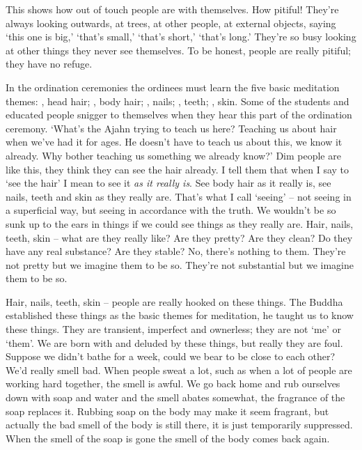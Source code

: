 This shows how out of touch people are with themselves. How pitiful! They're always looking outwards, at trees, at other people, at external objects, saying `this one is big,' `that's small,' `that's short,' `that's long.' They're so busy looking at other things they never see themselves. To be honest, people are really pitiful; they have no refuge.

In the ordination ceremonies the ordinees must learn the five basic meditation themes: , head hair; , body hair; , nails; , teeth; , skin. Some of the students and educated people snigger to themselves when they hear this part of the ordination ceremony. `What's the Ajahn trying to teach us here? Teaching us about hair when we've had it for ages. He doesn't have to teach us about this, we know it already. Why bother teaching us something we already know?' Dim people are like this, they think they can see the hair already. I tell them that when I say to `see the hair' I mean to see it \textit{as it really is}. See body hair as it really is, see nails, teeth and skin as they really are. That's what I call `seeing' -- not seeing in a superficial way, but seeing in accordance with the truth. We wouldn't be so sunk up to the ears in things if we could see things as they really are. Hair, nails, teeth, skin -- what are they really like? Are they pretty? Are they clean? Do they have any real substance? Are they stable? No, there's nothing to them. They're not pretty but we imagine them to be so. They're not substantial but we imagine them to be so.

Hair, nails, teeth, skin -- people are really hooked on these things. The Buddha established these things as the basic themes for meditation, he taught us to know these things. They are transient, imperfect and ownerless; they are not `me' or `them'. We are born with and deluded by these things, but really they are foul. Suppose we didn't bathe for a week, could we bear to be close to each other? We'd really smell bad. When people sweat a lot, such as when a lot of people are working hard together, the smell is awful. We go back home and rub ourselves down with soap and water and the smell abates somewhat, the fragrance of the soap replaces it. Rubbing soap on the body may make it seem fragrant, but actually the bad smell of the body is still there, it is just temporarily suppressed. When the smell of the soap is gone the smell of the body comes back again.

